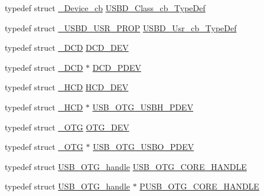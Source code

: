 \begin{DoxyCompactItemize}
\item 
typedef struct \hyperlink{struct___device__cb}{\-\_\-\-Device\-\_\-cb} \hyperlink{group___u_s_b___c_o_r_e___exported___types_ga94642fd764d31c3fb97bb089dc94d539}{U\-S\-B\-D\-\_\-\-Class\-\_\-cb\-\_\-\-Type\-Def}
\item 
typedef struct \hyperlink{struct___u_s_b_d___u_s_r___p_r_o_p}{\-\_\-\-U\-S\-B\-D\-\_\-\-U\-S\-R\-\_\-\-P\-R\-O\-P} \hyperlink{group___u_s_b___c_o_r_e___exported___types_ga333d185c45dd40a75aac486dd49b7160}{U\-S\-B\-D\-\_\-\-Usr\-\_\-cb\-\_\-\-Type\-Def}
\item 
typedef struct \hyperlink{struct___d_c_d}{\-\_\-\-D\-C\-D} \hyperlink{group___u_s_b___c_o_r_e___exported___types_gafdc88fd6bbf73ffac31887ff9a4c6f8e}{D\-C\-D\-\_\-\-D\-E\-V}
\item 
typedef struct \hyperlink{struct___d_c_d}{\-\_\-\-D\-C\-D} $\ast$ \hyperlink{group___u_s_b___c_o_r_e___exported___types_ga8af533fb342877409eed6b4fb3c9f0de}{D\-C\-D\-\_\-\-P\-D\-E\-V}
\item 
typedef struct \hyperlink{struct___h_c_d}{\-\_\-\-H\-C\-D} \hyperlink{group___u_s_b___c_o_r_e___exported___types_ga6efd576081986011501261979c241f23}{H\-C\-D\-\_\-\-D\-E\-V}
\item 
typedef struct \hyperlink{struct___h_c_d}{\-\_\-\-H\-C\-D} $\ast$ \hyperlink{group___u_s_b___c_o_r_e___exported___types_ga66dcefdc8d510df09216062844e72eeb}{U\-S\-B\-\_\-\-O\-T\-G\-\_\-\-U\-S\-B\-H\-\_\-\-P\-D\-E\-V}
\item 
typedef struct \hyperlink{struct___o_t_g}{\-\_\-\-O\-T\-G} \hyperlink{group___u_s_b___c_o_r_e___exported___types_ga54d11d7473e6091a9fef51d51d55c8f2}{O\-T\-G\-\_\-\-D\-E\-V}
\item 
typedef struct \hyperlink{struct___o_t_g}{\-\_\-\-O\-T\-G} $\ast$ \hyperlink{group___u_s_b___c_o_r_e___exported___types_ga4fffe7bd2476348a9e27e58eb2de188e}{U\-S\-B\-\_\-\-O\-T\-G\-\_\-\-U\-S\-B\-O\-\_\-\-P\-D\-E\-V}
\item 
typedef struct \hyperlink{struct_u_s_b___o_t_g__handle}{U\-S\-B\-\_\-\-O\-T\-G\-\_\-handle} \hyperlink{group___u_s_b___c_o_r_e___exported___types_gaf76054c11eb8a3367907aad7ae700e80}{U\-S\-B\-\_\-\-O\-T\-G\-\_\-\-C\-O\-R\-E\-\_\-\-H\-A\-N\-D\-L\-E}
\item 
typedef struct \hyperlink{struct_u_s_b___o_t_g__handle}{U\-S\-B\-\_\-\-O\-T\-G\-\_\-handle} $\ast$ \hyperlink{group___u_s_b___c_o_r_e___exported___types_gac768911c380d0040c6e1155815ffee2f}{P\-U\-S\-B\-\_\-\-O\-T\-G\-\_\-\-C\-O\-R\-E\-\_\-\-H\-A\-N\-D\-L\-E}
\end{DoxyCompactItemize}
